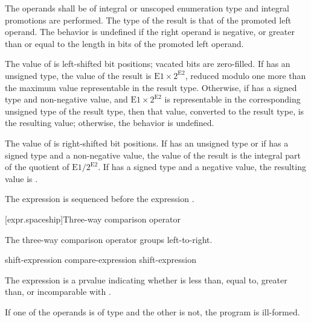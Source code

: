 The operands shall be of integral or unscoped enumeration type and integral
promotions are performed. The type of the result is that of the promoted
left operand.
%
The behavior is undefined if the right operand is negative, or greater
than or equal to the length in bits of the promoted left operand.

\pnum
The value of  is  left-shifted  bit positions; vacated bits are
zero-filled. If  has an unsigned type, the value of the result
is $\mathrm{E1}\times2^\mathrm{E2}$, reduced modulo
one more than the maximum value representable in the result type. Otherwise, if
 has a signed type and non-negative value, and $\mathrm{E1}\times2^\mathrm{E2}$ is
representable in the corresponding unsigned type of the result type, then
that value, converted to the result type, is the resulting value; otherwise, the
behavior is undefined.

\pnum
The value of  is  right-shifted 
bit positions. If  has an unsigned type or if  has a
signed type and a non-negative value, the value of the result is the
integral part of the quotient of $\mathrm{E1}/2^\mathrm{E2}$. If 
%
has a signed type and a negative value, the resulting value is
.

\pnum
The expression  is sequenced before the expression .

[expr.spaceship]{Three-way comparison operator}
%
%

\pnum
The three-way comparison operator groups left-to-right.

%
%
%

\begin{bnf}
\br
    shift-expression\br
    compare-expression \terminal{<=>} shift-expression
\end{bnf}

\pnum
The expression  is a prvalue indicating whether
 is less than, equal to, greater than, or incomparable with
.

\pnum
If one of the operands is of type 
and the other is not, the program is ill-formed.

